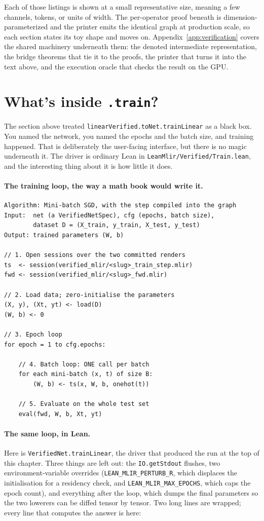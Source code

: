 Each of those listings is shown at a small representative size, meaning a
few channels, tokens, or units of width. The per-operator proof beneath
is dimension-parameterized and the printer emits the identical graph at
production scale, so each section states its toy shape and moves on.
Appendix~\ref{app:verification} covers the shared machinery underneath
them: the denoted intermediate representation, the bridge theorems that
tie it to the proofs, the printer that turns it into the text above, and
the execution oracle that checks the result on the GPU.

\section{What's inside \texttt{.train}?}
\label{sec:mlp_inside_train}

The section above treated \texttt{linearVerified.toNet.trainLinear} as a
black box. You named the network, you named the epochs and the batch size, and
training happened. That is deliberately the user-facing interface, but
there is no magic underneath it. The driver is ordinary Lean in
\texttt{LeanMlir/Verified/Train.lean}, and the interesting thing about it
is how little it does.

\paragraph{The training loop, the way a math book would write it.}
\begin{verbatim}
Algorithm: Mini-batch SGD, with the step compiled into the graph
Input:  net (a VerifiedNetSpec), cfg (epochs, batch size),
        dataset D = (X_train, y_train, X_test, y_test)
Output: trained parameters (W, b)

// 1. Open sessions over the two committed renders
ts  <- session(verified_mlir/<slug>_train_step.mlir)
fwd <- session(verified_mlir/<slug>_fwd.mlir)

// 2. Load data; zero-initialise the parameters
(X, y), (Xt, yt) <- load(D)
(W, b) <- 0

// 3. Epoch loop
for epoch = 1 to cfg.epochs:

    // 4. Batch loop: ONE call per batch
    for each mini-batch (x, t) of size B:
        (W, b) <- ts(x, W, b, onehot(t))

    // 5. Evaluate on the whole test set
    eval(fwd, W, b, Xt, yt)
\end{verbatim}

\paragraph{The same loop, in Lean.}
Here is \texttt{VerifiedNet.trainLinear}, the driver that produced the
run at the top of this chapter. Three things are left out: the
\texttt{IO.getStdout} flushes, two environment-variable overrides
(\texttt{LEAN\_MLIR\_PERTURB\_R}, which displaces the initialisation for
a residency check, and \texttt{LEAN\_MLIR\_MAX\_EPOCHS}, which caps the
epoch count), and everything after the loop, which dumps the final
parameters so the two lowerers can be diffed tensor by tensor. Two long
lines are wrapped; every line that computes the answer is here:

